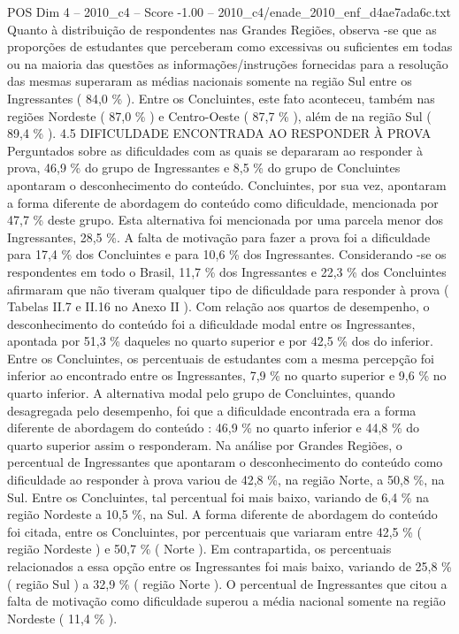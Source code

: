 \begin{textsample}{POS Dim 4 – 2010\_c4 – Score -1.00 – 2010\_c4/enade\_2010\_enf\_d4ae7ada6c.txt}
Quanto à distribuição de respondentes nas Grandes Regiões, observa -se que as proporções de estudantes que perceberam como excessivas ou suficientes em todas ou na maioria das questões as informações/instruções fornecidas para a resolução das mesmas superaram as médias nacionais somente na região Sul entre os Ingressantes ( 84,0 \% ).
Entre os Concluintes, este fato aconteceu, também nas regiões Nordeste ( 87,0 \% ) e Centro-Oeste ( 87,7 \% ), além de na região Sul ( 89,4 \% ). 4.5 DIFICULDADE ENCONTRADA AO RESPONDER À PROVA Perguntados sobre as dificuldades com as quais se depararam ao responder à prova, 46,9 \% do grupo de Ingressantes e 8,5 \% do grupo de Concluintes apontaram o desconhecimento do conteúdo.
Concluintes, por sua vez, apontaram a forma diferente de abordagem do conteúdo como dificuldade, mencionada por 47,7 \% deste grupo.
Esta alternativa foi mencionada por uma parcela menor dos Ingressantes, 28,5 \%.
A falta de motivação para fazer a prova foi a dificuldade para 17,4 \% dos Concluintes e para 10,6 \% dos Ingressantes.
Considerando -se os respondentes em todo o Brasil, 11,7 \% dos Ingressantes e 22,3 \% dos Concluintes afirmaram que não tiveram qualquer tipo de dificuldade para responder à prova ( Tabelas II.7 e II.16 no Anexo II ).
Com relação aos quartos de desempenho, o desconhecimento do conteúdo foi a dificuldade modal entre os Ingressantes, apontada por 51,3 \% daqueles no quarto superior e por 42,5 \% dos do inferior.
Entre os Concluintes, os percentuais de estudantes com a mesma percepção foi inferior ao encontrado entre os Ingressantes, 7,9 \% no quarto superior e 9,6 \% no quarto inferior.
A alternativa modal pelo grupo de Concluintes, quando desagregada pelo desempenho, foi que a dificuldade encontrada era a forma diferente de abordagem do conteúdo : 46,9 \% no quarto inferior e 44,8 \% do quarto superior assim o responderam.
Na análise por Grandes Regiões, o percentual de Ingressantes que apontaram o desconhecimento do conteúdo como dificuldade ao responder à prova variou de 42,8 \%, na região Norte, a 50,8 \%, na Sul.
Entre os Concluintes, tal percentual foi mais baixo, variando de 6,4 \% na região Nordeste a 10,5 \%, na Sul.
A forma diferente de abordagem do conteúdo foi citada, entre os Concluintes, por percentuais que variaram entre 42,5 \% ( região Nordeste ) e 50,7 \% ( Norte ).
Em contrapartida, os percentuais relacionados a essa opção entre os Ingressantes foi mais baixo, variando de 25,8 \% ( região Sul ) a 32,9 \% ( região Norte ).
O percentual de Ingressantes que citou a falta de motivação como dificuldade superou a média nacional somente na região Nordeste ( 11,4 \% ).

\end{textsample}
